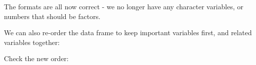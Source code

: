 \documentclass[
]{article}
\newenvironment{Shaded}{\begin{snugshade}}{\end{snugshade}}
\newcommand{\KeywordTok}[1]{\textcolor[rgb]{0.13,0.29,0.53}{\textbf{#1}}}
\newcommand{\NormalTok}[1]{#1}
\newcommand{\OperatorTok}[1]{\textcolor[rgb]{0.81,0.36,0.00}{\textbf{#1}}}
\newcommand{\StringTok}[1]{\textcolor[rgb]{0.31,0.60,0.02}{#1}}
\begin{document}
The formats are all now correct - we no longer have any character
variables, or numbers that should be factors.

We can also re-order the data frame to keep important variables first,
and related variables together:

\begin{Shaded}
\end{Shaded}

Check the new order:

\begin{Shaded}
\end{Shaded}
\end{document}
